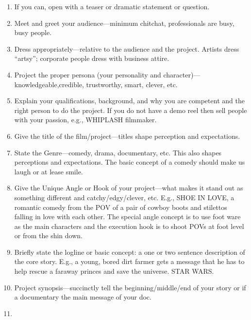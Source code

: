\documentclass[
]{book}
\providecommand{\tightlist}{%
  \setlength{\itemsep}{0pt}\setlength{\parskip}{0pt}}
\begin{document}
\begin{enumerate}
\def\labelenumi{\arabic{enumi}.}
\tightlist
\item
  If you can, open with a teaser or dramatic statement or question.\\
\item
  Meet and greet your audience---minimum chitchat, professionals are busy, busy people.\\
\item
  Dress appropriately---relative to the audience and the project. Artists dress ``artsy''; corporate people dress with business attire.\\
\item
  Project the proper persona (your personality and character)---knowledgeable,credible, trustworthy, smart, clever, etc.\\
\item
  Explain your qualifications, background, and why you are competent and the right person to do the project. If you do not have a demo reel then sell people with your passion, e.g., WHIPLASH filmmaker.\\
\item
  Give the title of the film/project---titles shape perception and expectations.\\
\item
  State the Genre---comedy, drama, documentary, etc. This also shapes perceptions and expectations. The basic concept of a comedy should make us laugh or at lease smile.\\
\item
  Give the Unique Angle or Hook of your project---what makes it stand out as something different and catchy/edgy/clever, etc. E.g., SHOE IN LOVE, a romantic comedy from the POV of a pair of cowboy boots and stilettos falling in love with each other. The special angle concept is to use foot ware as the main characters and the execution hook is to shoot POVs at foot level or from the shin down.\\
\item
  Briefly state the logline or basic concept: a one or two sentence description of the core story. E.g., a young, bored dirt farmer gets a message that he has to help rescue a faraway princes and save the universe. STAR WARS.\\
\item
  Project synopsis---succinctly tell the beginning/middle/end of your story or if a documentary the main message of your doc.\\
\item

\end{enumerate}
\end{document}
